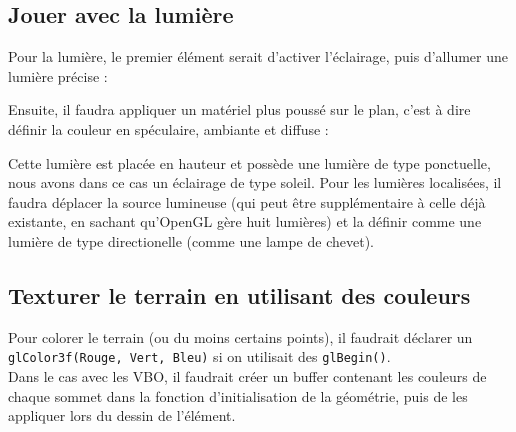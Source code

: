 \documentclass[a4paper,11pt]{report}
\begin{document}
	\subsection{Jouer avec la lumière}
	Pour la lumière, le premier élément serait d'activer l'éclairage, puis d'allumer une lumière précise :
	
	Ensuite, il faudra appliquer un matériel plus poussé sur le plan, c'est à dire définir la couleur en spéculaire, ambiante et diffuse :
	
	Cette lumière est placée en hauteur et possède une lumière de type ponctuelle, nous avons dans ce cas un éclairage de type soleil. Pour les lumières localisées, il faudra déplacer la source lumineuse (qui peut être supplémentaire à celle déjà existante, en sachant qu'OpenGL gère huit lumières) et la définir comme une lumière de type directionelle (comme une lampe de chevet).
	
	\subsection{Texturer le terrain en utilisant des couleurs}
	Pour colorer le terrain (ou du moins certains points), il faudrait déclarer un \lstinline{glColor3f(Rouge, Vert, Bleu)} si on utilisait des \lstinline{glBegin()}.\\
	Dans le cas avec les VBO, il faudrait créer un buffer contenant les couleurs de chaque sommet dans la fonction d'initialisation de la géométrie, puis de les appliquer lors du dessin de l'élément.
	
    	
\end{document}
